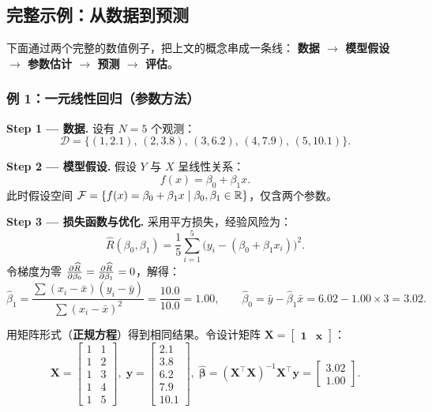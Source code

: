 \subsection{完整示例：从数据到预测}

下面通过两个完整的数值例子，把上文的概念串成一条线：
\textbf{数据 $\to$ 模型假设 $\to$ 参数估计 $\to$ 预测 $\to$ 评估}。

\subsubsection{例 1：一元线性回归（参数方法）}

\textbf{Step 1 --- 数据.}
设有 $N = 5$ 个观测：
\[
\mathcal{D} = \{(1, 2.1),\, (2, 3.8),\, (3, 6.2),\, (4, 7.9),\, (5, 10.1)\}.
\]

\textbf{Step 2 --- 模型假设.}
假设 $Y$ 与 $X$ 呈线性关系：
\begin{equation}\label{eq:ex_linear_model}
    f(x) = \beta_0 + \beta_1 x.
\end{equation}
此时假设空间 $\mathcal{F} = \{f(x) = \beta_0 + \beta_1 x \mid \beta_0, \beta_1 \in \mathbb{R}\}$，仅含两个参数。

\textbf{Step 3 --- 损失函数与优化.}
采用平方损失，经验风险为：
\[
\widehat{R}(\beta_0, \beta_1) = \frac{1}{5}\sum_{i=1}^{5} \big(y_i - (\beta_0 + \beta_1 x_i)\big)^2.
\]
令梯度为零 $\frac{\partial \widehat{R}}{\partial \beta_0} = \frac{\partial \widehat{R}}{\partial \beta_1} = 0$，解得：
\[
\hat{\beta}_1 = \frac{\sum (x_i - \bar{x})(y_i - \bar{y})}{\sum (x_i - \bar{x})^2} = \frac{10.0}{10.0} = 1.00,
\qquad
\hat{\beta}_0 = \bar{y} - \hat{\beta}_1 \bar{x} = 6.02 - 1.00 \times 3 = 3.02.
\]

用矩阵形式（\textbf{正规方程}）得到相同结果。令设计矩阵 $\mathbf{X} = \begin{bmatrix} \mathbf{1} & \mathbf{x} \end{bmatrix}$：
\[
\mathbf{X} =
\begin{bmatrix}
1 & 1 \\ 1 & 2 \\ 1 & 3 \\ 1 & 4 \\ 1 & 5
\end{bmatrix},\;
\mathbf{y} = \begin{bmatrix} 2.1 \\ 3.8 \\ 6.2 \\ 7.9 \\ 10.1 \end{bmatrix},\;
\hat{\bm{\beta}} = (\mathbf{X}^\top \mathbf{X})^{-1} \mathbf{X}^\top \mathbf{y}
= \begin{bmatrix} 3.02 \\ 1.00 \end{bmatrix}.
\]

